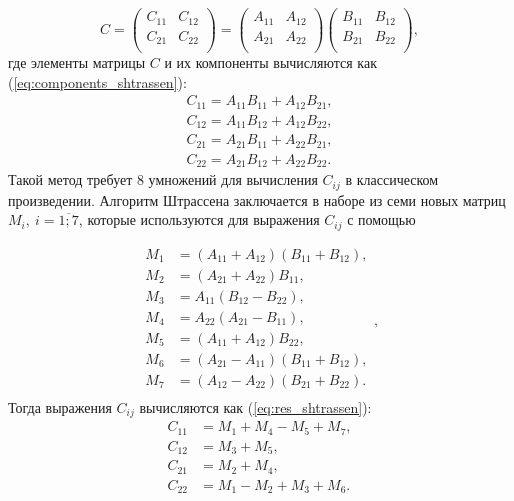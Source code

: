 \begin{equation}
	\label{eq:shtrassen}
	C = \begin{pmatrix}
		C_{11} & C_{12} \\
		C_{21} & C_{22} \\
	\end{pmatrix} = \begin{pmatrix}
		A_{11} & A_{12} \\
		A_{21} & A_{22} \\
	\end{pmatrix}
	\begin{pmatrix}
		B_{11} & B_{12} \\
		B_{21} & B_{22} \\
	\end{pmatrix},
\end{equation}
где элементы матрицы $C$ и их компоненты вычисляются как (\ref{eq:components_shtrassen}): 
\begin{equation}
	\label{eq:components_shtrassen}
	\begin{split}
	C_{11} = A_{11}B_{11} + A_{12}B_{21}, \\ 
	C_{12} = A_{11}B_{12} + A_{12}B_{22}, \\ 
	C_{21} = A_{21}B_{11} + A_{22}B_{21}, \\
	C_{22} = A_{21}B_{12} + A_{22}B_{22}.
	\end{split}
\end{equation}
Такой метод требует 8 умножений для вычисления $C_{ij}$ в классическом произведении. Алгоритм Штрассена заключается в наборе из семи новых матриц $M_{i},\ i=\overline{1;7}$, которые используются для выражения $C_{ij}$ с помощью 

\begin{equation}
	\label{eq:opt_shtrassen}
	\begin{aligned}
		M_{1} & = (A_{11}+A_{12})(B_{11}+B_{12}), \\ 
		M_{2} & = (A_{21}+A_{22})B_{11}, \\ 
		M_{3} & = A_{11}(B_{12}-B_{22}), \\
		M_{4} & = A_{22}(A_{21}-B_{11}), \\
		M_{5} & = (A_{11}+A_{12})B_{22}, \\ 
		M_{6} & = (A_{21}-A_{11})(B_{11}+B_{12}), \\ 
		M_{7} & = (A_{12}-A_{22})(B_{21}+B_{22}). \\
	\end{aligned},
\end{equation}
Тогда выражения $C_{ij}$ вычисляются как (\ref{eq:res_shtrassen}):
\begin{equation}
	\label{eq:res_shtrassen}
	\begin{aligned}
		C_{11} & = M_{1} + M_{4} - M_{5} + M_{7}, \\ 
		C_{12} & = M_{3} + M_{5}, \\ 
		C_{21} & = M_{2} + M_{4}, \\
		C_{22} & = M_{1} - M_{2} + M_{3} + M_{6}. \\
	\end{aligned}
\end{equation}

